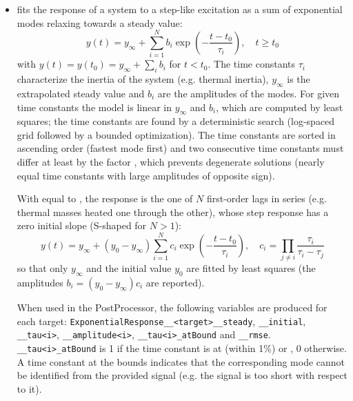 {\begin{itemize}
   has the following subnodes:
  \begin{itemize}
  \item {}, , indicates which
    degree of polynomial to fit to the presented data.
  \end{itemize}

\item {} fits the response of a system to a step-like excitation as a sum of
  exponential modes relaxing towards a steady value:
  \begin{equation*}
    y(t) = y_{\infty} + \sum_{i=1}^{N} b_i \exp\left(-\frac{t-t_0}{\tau_i}\right), \quad t \geq t_0
  \end{equation*}
  with $y(t) = y(t_0) = y_{\infty} + \sum_i b_i$ for $t < t_0$. The time constants $\tau_i$ characterize the
  inertia of the system (e.g. thermal inertia), $y_{\infty}$ is the extrapolated steady value and $b_i$ are the
  amplitudes of the modes. For given time constants the model is linear in $y_{\infty}$ and $b_i$, which are
  computed by least squares; the time constants are found by a deterministic search (log-spaced grid followed
  by a bounded optimization). The time constants are sorted in ascending order (fastest mode first) and two
  consecutive time constants must differ at least by the factor , which prevents degenerate
  solutions (nearly equal time constants with large amplitudes of opposite sign).

  With  equal to , the response is the one of $N$ first-order lags in series
  (e.g. thermal masses heated one through the other), whose step response has a zero initial slope (S-shaped
  for $N>1$):
  \begin{equation*}
    y(t) = y_{\infty} + (y_0 - y_{\infty}) \sum_{i=1}^{N} c_i \exp\left(-\frac{t-t_0}{\tau_i}\right), \quad
    c_i = \prod_{j \neq i} \frac{\tau_i}{\tau_i - \tau_j}
  \end{equation*}
  so that only $y_{\infty}$ and the initial value $y_0$ are fitted by least squares (the amplitudes
  $b_i = (y_0 - y_{\infty}) c_i$ are reported).

  When used in the  PostProcessor, the following variables are produced for each
  target: \texttt{ExponentialResponse\_\_<target>\_\_steady}, \texttt{\_\_initial}, \texttt{\_\_tau<i>},
  \texttt{\_\_amplitude<i>}, \texttt{\_\_tau<i>\_atBound} and \texttt{\_\_rmse}.
  \texttt{\_\_tau<i>\_atBound} is 1 if the time constant is at (within 1\%)  or
  , 0 otherwise.
  \nb A time constant at the bounds indicates that the corresponding mode cannot be identified from the
  provided signal (e.g. the signal is too short with respect to it).


\end{itemize}}
